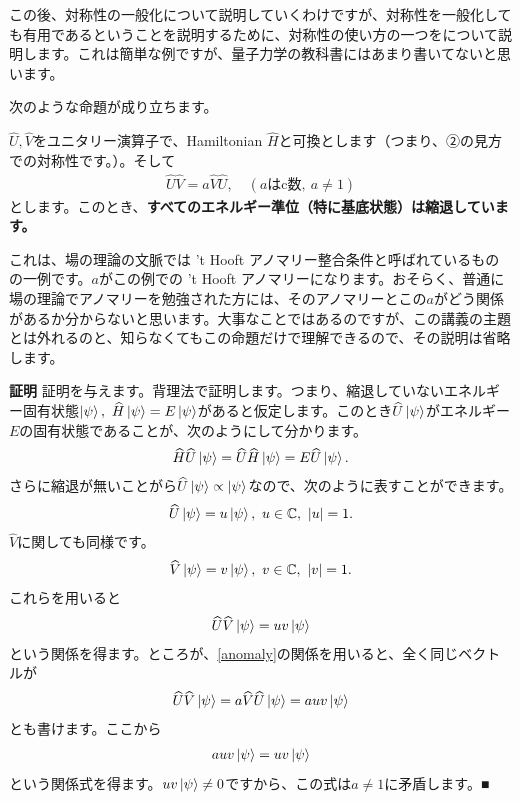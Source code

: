 \documentclass[report,paper=a4, fontsize=12pt, line_length=16cm, number_of_lines=33,dvipdfmx]{jlreq}
\newcommand{\qed}{■}
\newcommand{\kyou}[1]{{\sffamily \bfseries #1}}
\numberwithin{equation}{chapter}
\newcommand{\Cb}{\mathbb{C}}
\newcommand{\Hh}{\widehat{H}}
\newcommand{\Uh}{\widehat{U}}
\newcommand{\Vh}{\widehat{V}}
\begin{document}
この後、対称性の一般化について説明していくわけですが、対称性を一般化しても有用であるということを説明するために、対称性の使い方の一つをについて説明します。これは簡単な例ですが、量子力学の教科書にはあまり書いてないと思います。

次のような命題が成り立ちます。
\begin{proposition}[命題]
$\Uh,\Vh$をユニタリー演算子で、Hamiltonian $\Hh$と可換とします（つまり、②の見方での対称性です。）。そして
\begin{align}
  \Uh \Vh = a \Vh \Uh,\quad (a \text{はc数},\ a\ne 1)
  \label{anomaly}
\end{align}  
とします。このとき、\kyou{すべてのエネルギー準位（特に基底状態）は縮退しています。}
\end{proposition}
これは、場の理論の文脈では 't Hooft アノマリー整合条件と呼ばれているものの一例です。$a$がこの例での 't Hooft アノマリーになります。おそらく、普通に場の理論でアノマリーを勉強された方には、そのアノマリーとこの$a$がどう関係があるか分からないと思います。大事なことではあるのですが、この講義の主題とは外れるのと、知らなくてもこの命題だけで理解できるので、その説明は省略します。

\kyou{証明} 証明を与えます。背理法で証明します。つまり、縮退していないエネルギー固有状態$\ket{\psi},\ \Hh \ket{\psi}=E\ket{\psi}$があると仮定します。このとき$\Uh\ket{\psi}$がエネルギー$E$の固有状態であることが、次のようにして分かります。
\begin{align}
  \Hh \Uh \ket{\psi} =\Uh \Hh \ket{\psi}
  =E\Uh \ket{\psi}.
\end{align}
さらに縮退が無いことがら$\Uh \ket{\psi}\propto \ket{\psi}$なので、次のように表すことができます。
\begin{align}
  \Uh \ket{\psi}=u\ket{\psi},\ u\in \Cb,\ |u|=1.
\end{align}
$\Vh$に関しても同様です。
\begin{align}
  \Vh \ket{\psi}=v\ket{\psi},\ v \in \Cb,\ |v|=1.
\end{align}
これらを用いると
\begin{align}
  \Uh \Vh \ket{\psi}=uv\ket{\psi}
\end{align}
という関係を得ます。ところが、\eqref{anomaly}の関係を用いると、全く同じベクトルが
\begin{align}
  \Uh \Vh \ket{\psi}=a\Vh \Uh \ket{\psi}=a u v \ket{\psi}
\end{align}
とも書けます。ここから
\begin{align}
  auv\ket{\psi}=uv\ket{\psi}
\end{align}
という関係式を得ます。$uv\ket{\psi}\ne 0$ですから、この式は$a\ne 1$に矛盾します。\qed 
\end{document}

